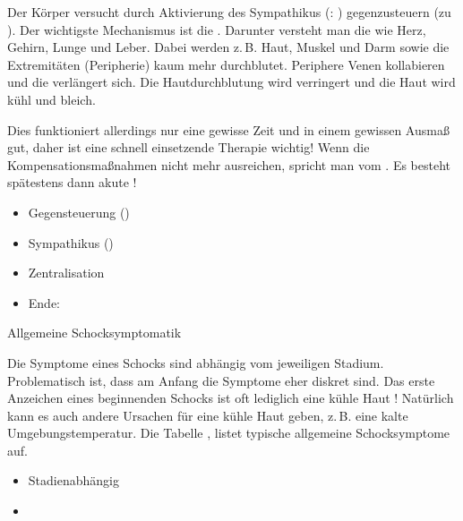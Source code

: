 {%
%
%
Der Körper versucht durch Aktivierung des Sympathikus (: )
gegenzusteuern (zu ). Der wichtigste
Mechanismus ist die
. Darunter versteht
man die 
wie Herz, Gehirn, Lunge und Leber. Dabei werden z.\,B. Haut,
Muskel und Darm sowie die Extremitäten (Peripherie) kaum
mehr  durchblutet.
Periphere Venen kollabieren und die 
verlängert sich. Die Hautdurchblutung wird verringert und
die Haut wird kühl und bleich.

Dies funktioniert allerdings nur eine
gewisse Zeit und in einem gewissen Ausmaß gut, daher ist
eine schnell  einsetzende Therapie wichtig! 
Wenn die Kompensationsmaßnahmen nicht mehr ausreichen, spricht man vom . Es besteht
spätestens dann akute !
}{
\begin{itemize}
    \item {Gegensteuerung} ()
    \item Sympathikus ()
    \item Zentralisation
    \item Ende: 
\end{itemize}
}{}{}{}








{Allgemeine Schocksymptomatik}
{\label{topic:schock-allgemeine-symptomatik}%
%
Die Symptome eines Schocks sind abhängig vom jeweiligen
Stadium. Problematisch ist, dass am Anfang die Symptome
eher diskret sind. Das erste Anzeichen eines beginnenden Schocks ist
oft lediglich eine kühle
Haut \cite{Kaplan2001}! Natürlich kann es
auch andere Ursachen für eine kühle Haut geben, z.\,B. eine
kalte Umgebungstemperatur. Die Tabelle
, listet typische
allgemeine Schocksymptome auf.


}
{%
\begin{itemize}
  \item Stadienabhängig
  \item {}
\end{itemize}
}
{}
{}
{}


